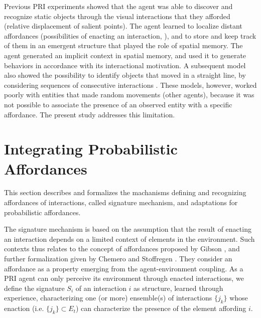 \documentclass[conference]{IEEEtran}
\begin{document}
Previous PRI experiments showed that the agent was able to discover and recognize static objects through the visual interactions that they afforded (relative displacement of salient points). 
The agent learned to localize distant affordances (possibilities of enacting an interaction, \cite{gibson:affordances}), and to store and keep track of them in an emergent structure that played the role of spatial memory. 
The agent generated an implicit context in spatial memory, and used it to generate behaviors in accordance with its interactional motivation. 
A subsequent model also showed the possibility to identify objects that moved in a straight line, by considering sequences of consecutive interactions \cite{gay:dynamic}. 
These models, however, worked poorly with entities that made random movements (other agents), because it was not possible to associate the presence of an observed entity with a specific affordance. The present study addresses this limitation.



\section{Integrating Probabilistic Affordances}


This section describes and formalizes the machanisms defining and recognizing affordances of interactions, called signature mechanism, and adaptations for probabilistic affordances.

The signature mechanism is based on the assumption that the result of enacting an interaction depends on a limited context of elements in the environment. Such contexts thus relates to the concept of affordances proposed by Gibson \cite{gibson:affordances}, and further formalization given by Chemero \cite{chemero:affordance} and Stoffregen \cite{stoffregen:affordance}.
They consider an affordance as a property emerging from the agent-environment coupling. As a PRI agent can only perceive its environment through enacted interactions, we define the signature $S_i$ of an interaction $i$ as structure, learned through experience, characterizing one (or more) ensemble(s) of interactions $\{j_k\}$ whose enaction (i.e. $\{j_k\} \subset E_t$) can characterize the presence of the element affording $i$.
\end{document}
